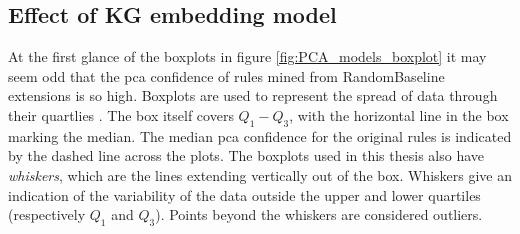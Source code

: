 \subsection{Effect of KG embedding model}
At the first glance of the boxplots in figure \ref{fig:PCA_models_boxplot} it may seem odd that the \gls{pca} confidence of rules mined from RandomBaseline extensions is so high. Boxplots are used to represent the spread of data through their quartlies \cite{dutoit2012graphical}. The box itself covers $Q_1-Q_3$, with the horizontal line in the box marking the median. The median \gls{pca} confidence for the original rules is indicated by the dashed line across the plots. The boxplots used in this thesis also have \textit{whiskers}, which are the lines extending vertically out of the box. Whiskers give an indication of the variability of the data outside the upper and lower quartiles (respectively $Q_1$ and $Q_3$). Points beyond the whiskers are considered outliers.

